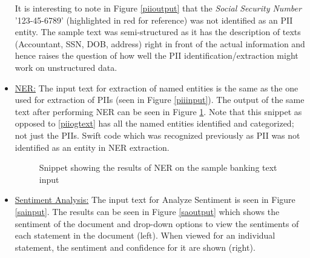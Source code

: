 \begin{itemize}
    It is interesting to note in Figure \ref{piioutput} that the \textit{Social Security Number} '123-45-6789' (highlighted in red for reference) was not identified as an \acs{PII} entity. The sample text was semi-structured as it has the description of texts (Accountant, SSN, DOB, address) right in front of the actual information and hence raises the question of how well the \acs{PII} identification/extraction might work on unstructured data. 
    
    \item \uline{NER:} The input text for extraction of named entities is the same as the one used for extraction of \acs{PII}s (seen in Figure \ref{piiinput}). The output of the same text after performing \acs{NER} can be seen in Figure \ref{nerogtext1}. Note that this snippet as opposed to \ref{piiogtext} has all the named entities identified and categorized; not just the \acs{PII}s. Swift code which was recognized previously as \acs{PII} was not identified as an entity in \acs{NER} extraction.
    \begin {figure}[h!h]
        \centering
        \caption{Snippet showing the results of \acs{NER} on the sample banking text input}
        \label{nerogtext1}
    \end {figure}
    \newpage
    \item \uline{Sentiment Analysis:} The input text for Analyze Sentiment is seen in Figure \ref{sainput}. The results can be seen in Figure \ref{saoutput} which shows the sentiment of the document and drop-down options to view the sentiments of each statement in the document (left). When viewed for an individual statement, the sentiment and confidence for it are shown (right).

\end{itemize}
